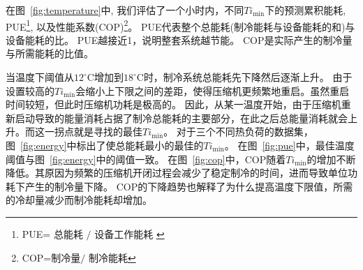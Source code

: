 在图~\ref{fig:temperature}中, 我们评估了一个小时内，不同$Ti_{\min}$下的预测累积能耗, PUE\footnote{PUE\text{ }=${\text {  总能耗 }}/{\text { 设备工作能耗 }}$\cite{song2015data}}, 以及性能系数(COP)\footnote{COP\text{ }=${\text {制冷量}}/{\text { 制冷能耗}}$\cite{song2015data}}。
PUE代表整个总能耗(制冷能耗与设备能耗的和)与设备能耗的比。
PUE越接近1，说明整套系统越节能。
COP是实际产生的制冷量与所需能耗的比值。

当温度下阈值从${12}^{\circ} \mathrm{C}$增加到${18}^{\circ} \mathrm{C}$时，制冷系统总能耗先下降然后逐渐上升。
由于设置较高的$Ti_{\min}$会缩小上下限之间的差距，使得压缩机更频繁地重启。虽然重启时间较短，但此时压缩机功耗是极高的。
因此，从某一温度开始，由于压缩机重新启动导致的能量消耗占据了制冷总能耗的主要部分，在此之后总能量消耗就会上升。而这一拐点就是寻找的最佳$Ti_{\min}$。
对于三个不同热负荷的数据集，图~\ref{fig:energy}中标出了使总能耗最小的最佳的$Ti_{\min}$。
在图~\ref{fig:pue}中，最佳温度阈值与图~\ref{fig:energy}中的阈值一致。
在图~\ref{fig:cop}中，COP随着$Ti_{\min}$的增加不断降低。其原因为频繁的压缩机开闭过程会减少了稳定制冷的时间，进而导致单位功耗下产生的制冷量下降。
COP的下降趋势也解释了为什么提高温度下限值，所需的冷却量减少而制冷能耗却增加。

